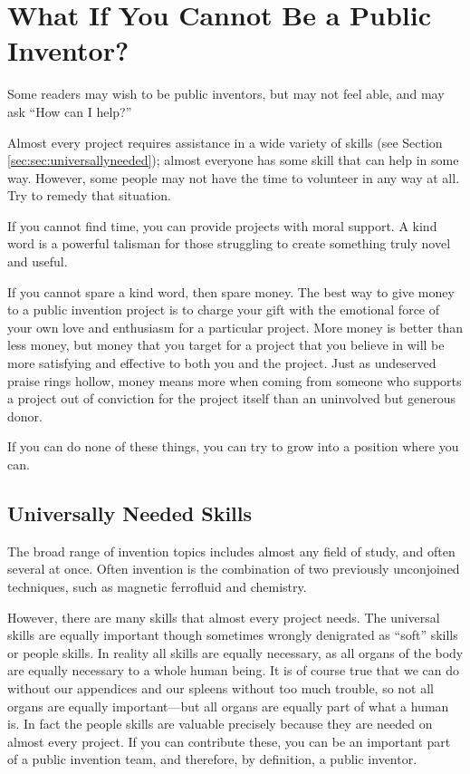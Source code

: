 \documentclass[
	fontsize=10pt, %
	twoside=false, %
	secnumdepth=1, %
]{kaobook}
\begin{document}
\chapter{What If You Cannot Be a Public Inventor?}

Some readers may wish to be public inventors, but may not
feel able, and may ask ``How can I help?''

Almost every project requires assistance in a wide variety
of skills (see Section \ref{sec:sec:universallyneeded}); almost everyone has some skill that can help in some way.
However, some people may not have the time to volunteer in any way
at all. Try to remedy that situation.

If you cannot find time, you can provide projects with moral support.
A kind word is a powerful talisman for those struggling
to create something truly novel and useful.

If you cannot spare a kind word, then spare money.
The best way to give money to a public invention project is
to charge your gift with the emotional force of your own
love and enthusiasm for a particular project.
More money is better than less money, but money that
you target for a project that you believe in will be
more satisfying and effective to both you and the project.
Just as undeserved praise rings hollow,
money means more when coming from someone who
supports a project out of conviction for
the project itself than an uninvolved but generous donor.

If you can do none of these things, you can try
to grow into a position where you can.

\section{Universally Needed Skills}

\label{sec:universallyneeded}

The broad range of invention topics includes almost any field of study, and
often several at once.
Often invention is the combination of two previously unconjoined techniques,
such as magnetic ferrofluid and chemistry.

However, there are many skills that almost every project needs.
The universal skills are equally important though sometimes wrongly denigrated as ``soft'' skills
or people skills.
In reality all skills are equally necessary, as all organs of the body are equally necessary to
a whole human being.
It is of course true that we can do without our appendices and our spleens without too much trouble,
so not all organs are equally important---but all organs are equally part of what a human is.
In fact the people skills are valuable precisely because they are needed on almost every project.
If you can contribute these, you can be an important part of a public invention team, and therefore,
by definition, a public inventor.
\end{document}
